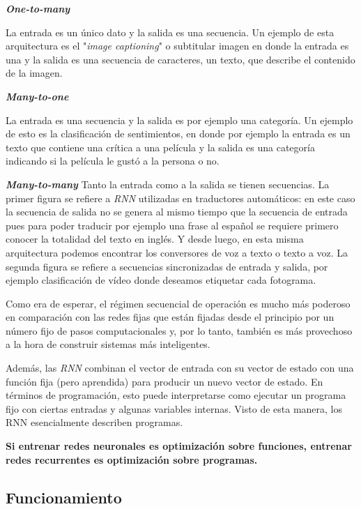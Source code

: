 \documentclass[a4paper,12pt]{article}
\begin{document}
\textbf{\textit{One-to-many}}

La entrada es un único dato y la salida es una secuencia. Un ejemplo de esta arquitectura es el "\textit{image captioning}" o subtitular imagen en donde la entrada es una y la salida es una secuencia de caracteres, un texto, que describe el contenido de la imagen.

\clearpage

\textbf{\textit{Many-to-one}}

La entrada es una secuencia y la salida es por ejemplo una categoría. Un ejemplo de esto es la clasificación de sentimientos, en donde por ejemplo la entrada es un texto que contiene una crítica a una película y la salida es una categoría indicando si la película le gustó a la persona o no.

\textbf{\textit{Many-to-many}}
Tanto la entrada como a la salida se tienen secuencias. La primer figura se refiere a \textit{RNN} utilizadas en traductores automáticos: en este caso la secuencia de salida no se genera al mismo tiempo que la secuencia de entrada pues para poder traducir por ejemplo una frase al español se requiere primero conocer la totalidad del texto en inglés. Y desde luego, en esta misma arquitectura podemos encontrar los conversores de voz a texto o texto a voz.
La segunda figura se refiere a secuencias sincronizadas de entrada y salida, por ejemplo clasificación de vídeo donde deseamos etiquetar cada fotograma.

Como era de esperar, el régimen secuencial de operación es mucho más poderoso en comparación con las redes fijas que están fijadas desde el principio por un número fijo de pasos computacionales y, por lo tanto, también es más provechoso a la hora de construir sistemas más inteligentes. 

Además, las \textit{RNN} combinan el vector de entrada con su vector de estado con una función fija (pero aprendida) para producir un nuevo vector de estado. En términos de programación, esto puede interpretarse como ejecutar un programa fijo con ciertas entradas y algunas variables internas. Visto de esta manera, los RNN esencialmente describen programas.

\textbf{Si entrenar redes neuronales es optimización sobre funciones, entrenar redes recurrentes es optimización sobre programas.}

\clearpage

\subsection{Funcionamiento}
\end{document}

